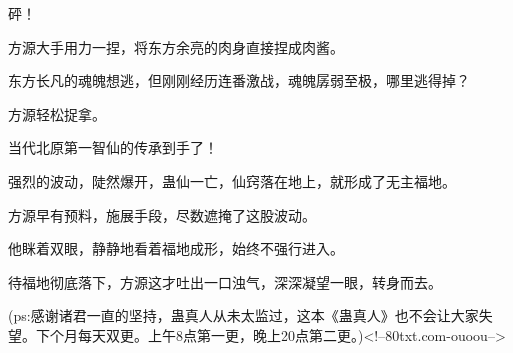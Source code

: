 \begin{this_body}
砰！

方源大手用力一捏，将东方余亮的肉身直接捏成肉酱。

东方长凡的魂魄想逃，但刚刚经历连番激战，魂魄孱弱至极，哪里逃得掉？

方源轻松捉拿。

当代北原第一智仙的传承到手了！

强烈的波动，陡然爆开，蛊仙一亡，仙窍落在地上，就形成了无主福地。

方源早有预料，施展手段，尽数遮掩了这股波动。

他眯着双眼，静静地看着福地成形，始终不强行进入。

待福地彻底落下，方源这才吐出一口浊气，深深凝望一眼，转身而去。

(ps:感谢诸君一直的坚持，蛊真人从未太监过，这本《蛊真人》也不会让大家失望。下个月每天双更。上午8点第一更，晚上20点第二更。)<!--80txt.com-ouoou-->

\end{this_body}

